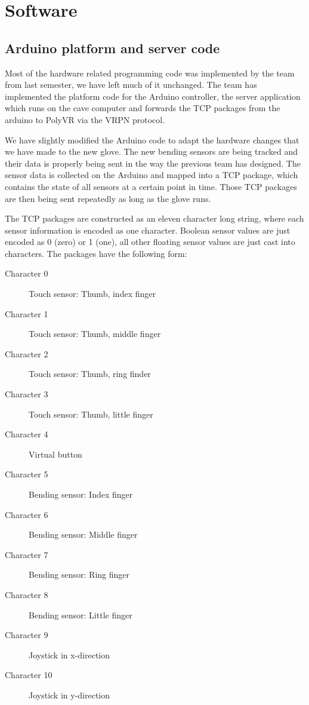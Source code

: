 \section{Software}

\subsection{Arduino platform and server code}
\label{arduinoandserver}

Most of the hardware related programming code was implemented by the team from last semester, we have left much of it unchanged. The team has implemented the platform code for the Arduino controller, the server application which runs on the cave computer and forwards the TCP packages from the arduino to PolyVR via the VRPN protocol.

We have slightly modified the Arduino code to adapt the hardware changes that we have made to the new glove. The new bending sensors are being tracked and their data is properly being sent in the way the previous team has designed. The sensor data is collected on the Arduino and mapped into a TCP package, which contains the state of all sensors at a certain point in time. Those TCP packages are then being sent repeatedly as long as the glove runs.

The TCP packages are constructed as an eleven character long string, where each sensor information is encoded as one character. Boolean sensor values are just encoded as 0 (zero) or 1 (one), all other floating sensor values are just cast into characters. The packages have the following form:

\label{tcppackageform}
\begin{description}
	\item[Character 0] Touch sensor: Thumb, index finger
	\item[Character 1] Touch sensor: Thumb, middle finger
	\item[Character 2] Touch sensor: Thumb, ring finder
	\item[Character 3] Touch sensor: Thumb, little finger
	\item[Character 4] Virtual button
	\item[Character 5] Bending sensor: Index finger
	\item[Character 6] Bending sensor: Middle finger
	\item[Character 7] Bending sensor: Ring finger
	\item[Character 8] Bending sensor: Little finger
	\item[Character 9] Joystick in x-direction
	\item[Character 10] Joystick in y-direction
\end{description}

